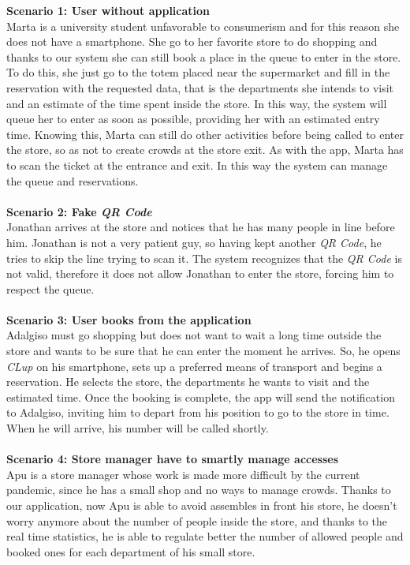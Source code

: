 \documentclass{article}
\begin{document}
	{\bfseries Scenario 1: User without application} \\
	Marta is a university student unfavorable to consumerism and for this reason she does not have a smartphone. She go to her favorite store to do shopping and thanks to our system she can still book a place in the queue to enter in the store. To do this, she just go to the totem placed near the supermarket and fill in the reservation with the requested data, that is the departments she intends to visit and an estimate of the time spent inside the store. In this way, the system will queue her to enter as soon as possible, providing her with an estimated entry time. Knowing this, Marta can still do other activities before being called to enter the store, so as not to create crowds at the store exit. As with the app, Marta has to scan the ticket at the  entrance and exit. In this way the system can manage the queue and reservations. \\ \\
	{\bfseries Scenario 2: Fake \emph{QR Code}} \\
	Jonathan arrives at the store and notices that he has many people in line before him. Jonathan is not a very patient guy, so having kept another \emph{QR Code}, he tries to skip the line trying to scan it. The system recognizes that the \emph{QR Code} is not valid, therefore it does not allow Jonathan to enter the store, forcing him to respect the queue. \\ \\
	{\bfseries Scenario 3: User books from the application} \\
	Adalgiso must go shopping but does not want to wait a long time outside the store and wants to be sure that he can enter the moment he arrives. So, he opens \emph{CLup} on his smartphone, sets up a preferred means of transport and begins a reservation. He selects the store, the departments he wants to visit and the estimated time. Once the booking is complete, the app will send the notification to Adalgiso, inviting him to depart from his position to go to the store in time. When he will arrive, his number will be called shortly.\\ \\
	{\bfseries Scenario 4: Store manager have to smartly manage accesses} \\
	Apu is a store manager whose work is made more difficult by the current pandemic, since he has a small shop and no ways to manage crowds. Thanks to our application, now Apu is able to avoid assembles in front his store, he doesn't worry anymore about the number of people inside the store, and thanks to the real time statistics, he is able to regulate better the number of allowed people and booked ones for each department of his small store.\\\\
\end{document}
